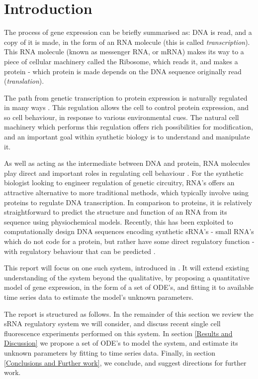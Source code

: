 \documentclass[10pt,journal]{./IEEE_latex_class/IEEEtran}
\begin{document}
\IEEEpeerreviewmaketitle




\section{Introduction}
\label{sec: Intro}
The process of gene expression can be briefly summarised as: DNA is read, and a copy of it is made, in the form of an RNA molecule (this is called \textit{transcription}). This RNA molecule (known as messenger RNA, or mRNA) makes its way to a piece of cellular machinery called the Ribosome, which reads it, and makes a protein - which protein is made depends on the DNA sequence originally read (\textit{translation}).  

 The path from genetic transcription to protein expression is naturally regulated in many ways \cite{MolecularBiology}. This regulation allows the cell to control protein expression, and so cell behaviour, in response to various environmental cues. The natural cell machinery which performs this regulation offers rich possibilities for modification, and an important goal within synthetic biology is to understand and manipulate it.

As well as acting as the intermediate between DNA and protein, RNA molecules play direct and important roles in regulating cell behaviour \cite{Isaacs2006}. For the synthetic biologist looking to engineer regulation of genetic circuitry, RNA's offers an attractive alternative to more traditional methods, which typically involve using proteins to regulate DNA transcription. In comparison to proteins, it is relatively straightforward to predict the structure and function of an RNA from its sequence using physiochemical models. Recently, this has been exploited to computationally design DNA sequences encoding synthetic sRNA's - small RNA's which do not code for a protein, but rather have some direct regulatory function -  with regulatory behaviour that can be predicted \cite{Rodrigo2013}\cite{Rodrigo2012}.

This report will focus on one such system, introduced in \cite{Rodrigo2012}. It will extend existing understanding of the system beyond the qualitative, by proposing a quantitative model of gene expression, in the form of a set of ODE's, and fitting it to available time series data to estimate the model's unknown parameters.

The report is structured as follows. In the remainder of this section we review the sRNA regulatory system we will consider, and discuss recent single cell fluorescence experiments performed on this system. In section \ref{Results and Discussion} we propose a set of ODE's to model the system, and estimate its unknown parameters by fitting to time series data. Finally, in section \ref{Conclusions and Further work}, we conclude, and suggest directions for further work.
\end{document}
